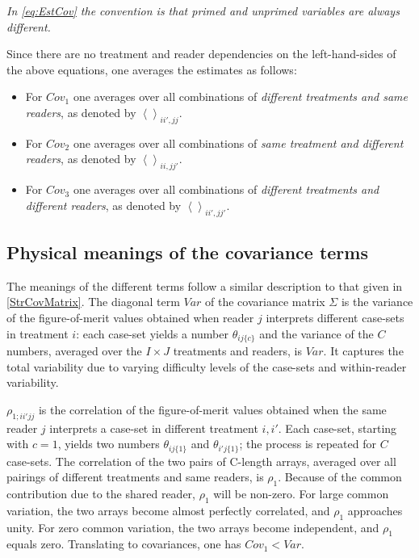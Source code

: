 \documentclass[
]{book}
\providecommand{\tightlist}{%
  \setlength{\itemsep}{0pt}\setlength{\parskip}{0pt}}
\begin{document}
\emph{In \eqref{eq:EstCov} the convention is that primed and unprimed variables are always different.}

Since there are no treatment and reader dependencies on the left-hand-sides of the above equations, one averages the estimates as follows:

\begin{itemize}
\tightlist
\item
  For \(Cov_1\) one averages over all combinations of \emph{different treatments and same readers}, as denoted by \(\left \langle \right \rangle_{ii',jj}\).
\item
  For \(Cov_2\) one averages over all combinations of \emph{same treatment and different readers}, as denoted by \(\left \langle \right \rangle_{ii,jj'}\).
\item
  For \(Cov_3\) one averages over all combinations of \emph{different treatments and different readers}, as denoted by \(\left \langle \right \rangle_{ii',jj'}\).
\end{itemize}

\hypertarget{physical-meanings-of-the-covariance-terms}{%
\subsection{Physical meanings of the covariance terms}\label{physical-meanings-of-the-covariance-terms}}

The meanings of the different terms follow a similar description to that given in \ref{StrCovMatrix}. The diagonal term \(Var\) of the covariance matrix \(\Sigma\) is the variance of the figure-of-merit values obtained when reader \(j\) interprets different case-sets in treatment \(i\): each case-set yields a number \(\theta_{ij\{c\}}\) and the variance of the \(C\) numbers, averaged over the \(I \times J\) treatments and readers, is \(Var\). It captures the total variability due to varying difficulty levels of the case-sets and within-reader variability.

\(\rho_{1;ii'jj}\) is the correlation of the figure-of-merit values obtained when the same reader \(j\) interprets a case-set in different treatment \(i,i'\). Each case-set, starting with \(c = 1\), yields two numbers \(\theta_{ij\{1\}}\) and \(\theta_{i'j\{1\}}\); the process is repeated for \(C\) case-sets. The correlation of the two pairs of C-length arrays, averaged over all pairings of different treatments and same readers, is \(\rho_1\). Because of the common contribution due to the shared reader, \(\rho_1\) will be non-zero. For large common variation, the two arrays become almost perfectly correlated, and \(\rho_1\) approaches unity. For zero common variation, the two arrays become independent, and \(\rho_1\) equals zero. Translating to covariances, one has \(Cov_1 < Var\).
\end{document}
